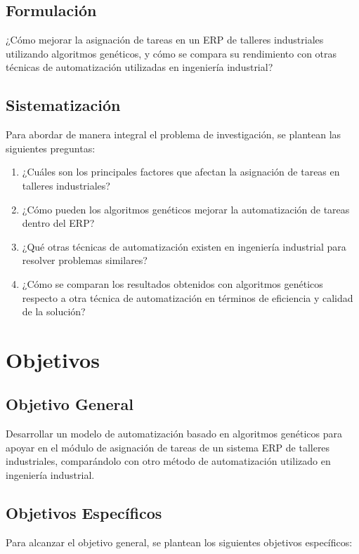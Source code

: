 \subsection{Formulación}
¿Cómo mejorar la asignación de tareas en un ERP de talleres industriales utilizando algoritmos genéticos, y cómo se compara su rendimiento con otras técnicas de automatización utilizadas en ingeniería industrial?

\subsection{Sistematización}
Para abordar de manera integral el problema de investigación, se plantean las siguientes preguntas:

\begin{enumerate}
    \item ¿Cuáles son los principales factores que afectan la asignación de tareas en talleres industriales?
    \item ¿Cómo pueden los algoritmos genéticos mejorar la automatización de tareas dentro del ERP?
    \item ¿Qué otras técnicas de automatización existen en ingeniería industrial para resolver problemas similares?
    \item ¿Cómo se comparan los resultados obtenidos con algoritmos genéticos respecto a otra técnica de automatización en términos de eficiencia y calidad de la solución?
\end{enumerate}

\section{Objetivos}

\subsection{Objetivo General} 
Desarrollar un modelo de automatización basado en algoritmos genéticos para apoyar en el módulo de asignación de tareas de un sistema ERP de talleres industriales, comparándolo con otro método de automatización utilizado en ingeniería industrial.

\subsection{Objetivos Específicos}
Para alcanzar el objetivo general, se plantean los siguientes objetivos específicos:


